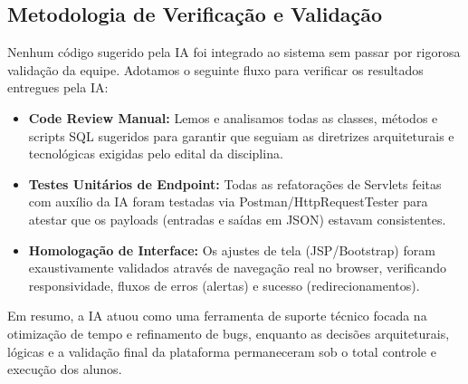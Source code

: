 \subsection{Metodologia de Verificação e Validação}
Nenhum código sugerido pela IA foi integrado ao sistema sem passar por rigorosa validação da equipe. Adotamos o seguinte fluxo para verificar os resultados entregues pela IA:
\begin{itemize}
    \item \textbf{Code Review Manual:} Lemos e analisamos todas as classes, métodos e scripts SQL sugeridos para garantir que seguiam as diretrizes arquiteturais e tecnológicas exigidas pelo edital da disciplina.
    \item \textbf{Testes Unitários de Endpoint:} Todas as refatorações de Servlets feitas com auxílio da IA foram testadas via Postman/HttpRequestTester para atestar que os payloads (entradas e saídas em JSON) estavam consistentes.
    \item \textbf{Homologação de Interface:} Os ajustes de tela (JSP/Bootstrap) foram exaustivamente validados através de navegação real no browser, verificando responsividade, fluxos de erros (alertas) e sucesso (redirecionamentos).
\end{itemize}

Em resumo, a IA atuou como uma ferramenta de suporte técnico focada na otimização de tempo e refinamento de bugs, enquanto as decisões arquiteturais, lógicas e a validação final da plataforma permaneceram sob o total controle e execução dos alunos.
